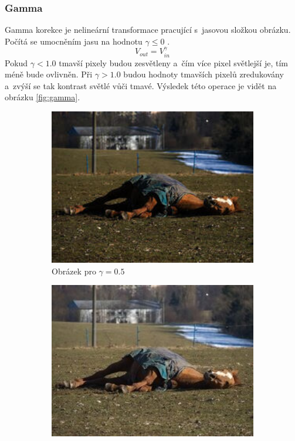 \documentclass[11pt, a4paper, titlepage]{article}
\begin{document}
\subsubsection{Gamma}
Gamma korekce je nelineární transformace pracující s~jasovou složkou obrázku.
Počítá se umocněním jasu na hodnotu $\gamma \leq 0$ \cite{wiki:Gamma_correction}.
$$V_{out}=V_{in}^\gamma$$
Pokud $\gamma < 1.0$ tmavší pixely budou zesvětleny a~čím více pixel světlejší je, tím méně bude ovlivněn.
Při $\gamma > 1.0$ budou hodnoty tmavších pixelů zredukovány a~zvýší se tak kontrast světlé vůči tmavé.
Výsledek této operace je vidět na obrázku \ref{fig:gamma}.
\begin{figure}[h]
    \centering
    \begin{subfigure}[t]{0.25\textwidth}
        \vskip 0pt
        \includegraphics[width=1.0\textwidth]{horse_gamma_minus.jpg}
        \caption{Obrázek pro $\gamma = 0.5$}
    \end{subfigure}
    \hspace{1cm}
    \begin{subfigure}[t]{0.25\textwidth}
        \vskip 0pt
        \includegraphics[width=1.0\textwidth]{horse_original.jpg}

\end{subfigure}
\end{figure}
\end{document}
